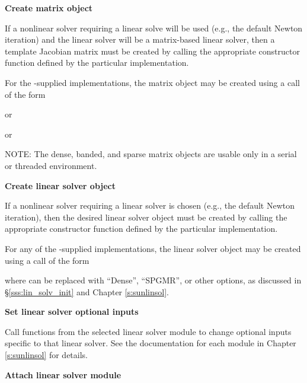 \begin{Steps}
\item\label{i:matrix}
  {\bf Create matrix object}

  If a nonlinear solver requiring a linear solve will be used (e.g., the
  default Newton iteration) and the linear solver will be a matrix-based linear
  solver, then a template Jacobian matrix must be created by calling the
  appropriate constructor function defined by the particular {\sunmatrix}
  implementation.

  For the {\sundials}-supplied {\sunmatrix} implementations, the
  matrix object may be created using a call of the form


   or


   or


  NOTE: The dense, banded, and sparse matrix objects are usable only in a
  serial or threaded environment.

\item\label{i:lin_solver}
  {\bf Create linear solver object}

  If a nonlinear solver requiring a linear solver is chosen (e.g., the default
  Newton iteration), then the desired linear solver object must be created by
  calling the appropriate constructor function defined by the particular
  {\sunlinsol} implementation.

  For any of the {\sundials}-supplied {\sunlinsol} implementations,
  the linear solver object may be created using a call of the form


  where \id{*} can be replaced with ``Dense'', ``SPGMR'', or other
  options, as discussed in \S\ref{sss:lin_solv_init} and Chapter {\ref{s:sunlinsol}}.

\item
  {\bf Set linear solver optional inputs}

  Call  functions from the selected linear solver module to
  change optional inputs specific to that linear solver.
  See the documentation for each {\sunlinsol} module in Chapter
  {\ref{s:sunlinsol}} for details.

\item\label{i:lin_solver_interface}
  {\bf Attach linear solver module}


\end{Steps}
